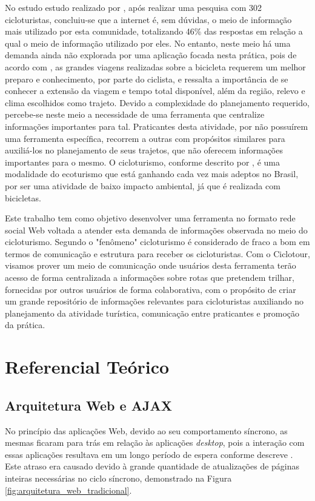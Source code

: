No estudo estudo realizado por \cite{perfilCicloturista}, após realizar uma pesquisa com 302 cicloturistas, concluiu-se que a internet é, sem dúvidas, 
o meio de informação mais utilizado por esta comunidade, totalizando 46\% das respostas em relação a qual o meio de informação utilizado por eles.
No entanto, neste meio há uma demanda ainda não explorada por uma aplicação focada nesta prática, pois de acordo com \cite{cicloturismo02}, 
as grandes viagens realizadas sobre a bicicleta requerem um melhor preparo e conhecimento, por parte do ciclista, e ressalta a importância de se 
conhecer a extensão da viagem e tempo total disponível, além da região, relevo e clima escolhidos como trajeto. Devido a complexidade do planejamento
requerido, percebe-se neste meio a necessidade de uma ferramenta que centralize informações importantes para tal. Praticantes desta atividade, por não 
possuírem uma ferramenta específica, recorrem a outras com propósitos similares para auxiliá-los no planejamento de seus trajetos, que não oferecem 
informações importantes para o mesmo. O cicloturismo, conforme descrito por \cite{cicloturismo01}, é uma modalidade do ecoturismo que está 
ganhando cada vez mais adeptos no Brasil, por ser uma atividade de baixo impacto ambiental, já que é realizada com bicicletas.

Este trabalho tem como objetivo desenvolver uma ferramenta no formato rede social Web voltada a atender esta demanda de informações observada 
no meio do cicloturismo. Segundo \cite{perfilCicloturista} o  "fenômeno" cicloturismo é considerado de fraco a bom em termos de comunicação 
e estrutura para receber os cicloturistas. Com o Ciclotour, visamos prover um meio de comunicação onde usuários desta ferramenta terão acesso de 
forma centralizada a informações sobre rotas que pretendem trilhar, fornecidas por outros usuários de forma colaborativa, com o propósito 
de criar um grande repositório de informações relevantes para cicloturistas auxiliando no planejamento da atividade turística, comunicação entre 
praticantes e promoção da prática.

\section{\esp Referencial Teórico}
\subsection{Arquitetura Web e AJAX}
No princípio das aplicações Web, devido ao seu comportamento síncrono, as mesmas ficaram para trás em relação às aplicações \textit{desktop}, pois a 
interação com essas aplicações resultava em um longo período de espera conforme descreve \cite{deitelAjax}. Este atraso era causado devido à grande 
quantidade de atualizações de páginas inteiras necessárias no ciclo síncrono, demonstrado na Figura \ref{fig:arquitetura_web_tradicional}. 

